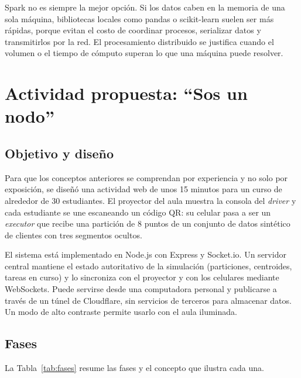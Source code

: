 \documentclass[conference,a4paper]{IEEEtran}
\begin{document}
Spark no es siempre la mejor opción. Si los datos caben en la memoria de una sola máquina, bibliotecas locales como pandas o scikit-learn suelen ser más rápidas, porque evitan el costo de coordinar procesos, serializar datos y transmitirlos por la red. El procesamiento distribuido se justifica cuando el volumen o el tiempo de cómputo superan lo que una máquina puede resolver.

\section{Actividad propuesta: ``Sos un nodo''}
\label{sec:actividad}

\subsection{Objetivo y diseño}

Para que los conceptos anteriores se comprendan por experiencia y no solo por exposición, se diseñó una actividad web de unos 15 minutos para un curso de alrededor de 30 estudiantes. El proyector del aula muestra la consola del \textit{driver} y cada estudiante se une escaneando un código QR: su celular pasa a ser un \textit{executor} que recibe una partición de 8 puntos de un conjunto de datos sintético de clientes con tres segmentos ocultos.

El sistema está implementado en Node.js con Express y Socket.io. Un servidor central mantiene el estado autoritativo de la simulación (particiones, centroides, tareas en curso) y lo sincroniza con el proyector y con los celulares mediante WebSockets. Puede servirse desde una computadora personal y publicarse a través de un túnel de Cloudflare, sin servicios de terceros para almacenar datos. Un modo de alto contraste permite usarlo con el aula iluminada.

\subsection{Fases}

La Tabla~\ref{tab:fases} resume las fases y el concepto que ilustra cada una.
\end{document}

